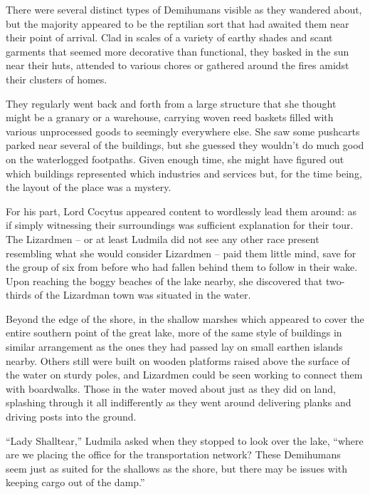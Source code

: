  

There were several distinct types of Demihumans visible as they wandered about, but the majority appeared to be the reptilian sort that had awaited them near their point of arrival. Clad in scales of a variety of earthy shades and scant garments that seemed more decorative than functional, they basked in the sun near their huts, attended to various chores or gathered around the fires amidst their clusters of homes.




They regularly went back and forth from a large structure that she thought might be a granary or a warehouse, carrying woven reed baskets filled with various unprocessed goods to seemingly everywhere else. She saw some pushcarts parked near several of the buildings, but she guessed they wouldn’t do much good on the waterlogged footpaths. Given enough time, she might have figured out which buildings represented which industries and services but, for the time being, the layout of the place was a mystery.

 

For his part, Lord Cocytus appeared content to wordlessly lead them around: as if simply witnessing their surroundings was sufficient explanation for their tour. The Lizardmen – or at least Ludmila did not see any other race present resembling what she would consider Lizardmen – paid them little mind, save for the group of six from before who had fallen behind them to follow in their wake. Upon reaching the boggy beaches of the lake nearby, she discovered that two-thirds of the Lizardman town was situated in the water.

 

Beyond the edge of the shore, in the shallow marshes which appeared to cover the entire southern point of the great lake, more of the same style of buildings in similar arrangement as the ones they had passed lay on small earthen islands nearby. Others still were built on wooden platforms raised above the surface of the water on sturdy poles, and Lizardmen could be seen working to connect them with boardwalks. Those in the water moved about just as they did on land, splashing through it all indifferently as they went around delivering planks and driving posts into the ground.

 

“Lady Shalltear,” Ludmila asked when they stopped to look over the lake, “where are we placing the office for the transportation network? These Demihumans seem just as suited for the shallows as the shore, but there may be issues with keeping cargo out of the damp.”

